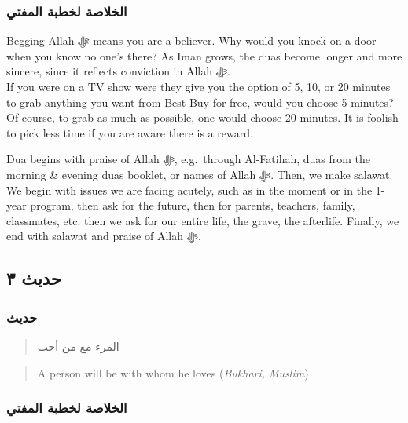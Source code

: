 \documentclass[
]{book}
\begin{document}
\hypertarget{ux627ux644ux62eux644ux627ux635ux629-ux644ux62eux637ux628ux629-ux627ux644ux645ux641ux62aux64a-1}{%
\subsubsection{الخلاصة لخطبة المفتي}\label{ux627ux644ux62eux644ux627ux635ux629-ux644ux62eux637ux628ux629-ux627ux644ux645ux641ux62aux64a-1}}

Begging Allah ﷻ means you are a believer. Why would you knock on a door when you know no one's there? As Iman grows, the duas become longer and more sincere, since it reflects conviction in Allah ﷻ.\\
If you were on a TV show were they give you the option of 5, 10, or 20 minutes to grab anything you want from Best Buy for free, would you choose 5 minutes? Of course, to grab as much as possible, one would choose 20 minutes. It is foolish to pick less time if you are aware there is a reward.

Dua begins with praise of Allah ﷻ, e.g.~through Al-Fatihah, duas from the morning \& evening duas booklet, or names of Allah ﷻ. Then, we make salawat. We begin with issues we are facing acutely, such as in the moment or in the 1-year program, then ask for the future, then for parents, teachers, family, classmates, etc. then we ask for our entire life, the grave, the afterlife. Finally, we end with salawat and praise of Allah ﷻ.

\hypertarget{ux62dux62fux64aux62b-ux663}{%
\subsection{حديث ٣}\label{ux62dux62fux64aux62b-ux663}}

\hypertarget{ux62dux62fux64aux62b-2}{%
\subsubsection{حديث}\label{ux62dux62fux64aux62b-2}}

\begin{quote}
المرء مع من أحب
\end{quote}

\begin{quote}
A person will be with whom he loves (\emph{Bukhari, Muslim})
\end{quote}

\hypertarget{ux627ux644ux62eux644ux627ux635ux629-ux644ux62eux637ux628ux629-ux627ux644ux645ux641ux62aux64a-2}{%
\subsubsection{الخلاصة لخطبة المفتي}\label{ux627ux644ux62eux644ux627ux635ux629-ux644ux62eux637ux628ux629-ux627ux644ux645ux641ux62aux64a-2}}
\end{document}
